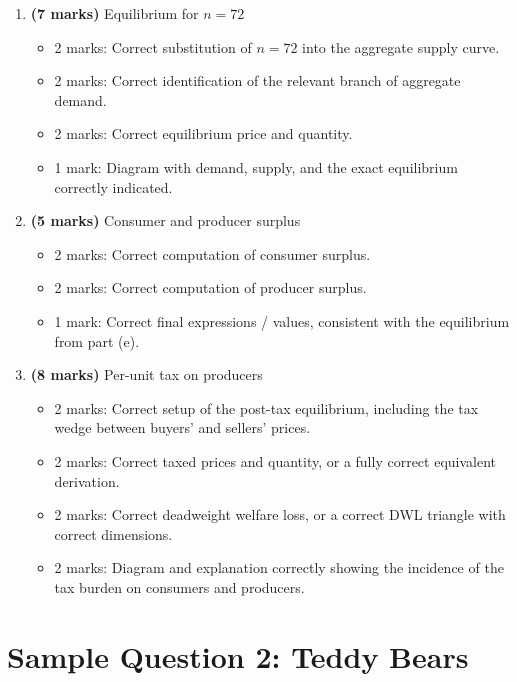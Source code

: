 \documentclass[12pt]{article}
\begin{document}
\begin{enumerate}[label=(\alph*)]
    \item \textbf{(7 marks)} Equilibrium for \(n=72\)
    \begin{itemize}
        \item 2 marks: Correct substitution of \(n=72\) into the aggregate supply curve.
        \item 2 marks: Correct identification of the relevant branch of aggregate demand.
        \item 2 marks: Correct equilibrium price and quantity.
        \item 1 mark: Diagram with demand, supply, and the exact equilibrium correctly indicated.
    \end{itemize}

    \item \textbf{(5 marks)} Consumer and producer surplus
    \begin{itemize}
        \item 2 marks: Correct computation of consumer surplus.
        \item 2 marks: Correct computation of producer surplus.
        \item 1 mark: Correct final expressions / values, consistent with the equilibrium from part (e).
    \end{itemize}

    \item \textbf{(8 marks)} Per-unit tax on producers
    \begin{itemize}
        \item 2 marks: Correct setup of the post-tax equilibrium, including the tax wedge between buyers’ and sellers’ prices.
        \item 2 marks: Correct taxed prices and quantity, or a fully correct equivalent derivation.
        \item 2 marks: Correct deadweight welfare loss, or a correct DWL triangle with correct dimensions.
        \item 2 marks: Diagram and explanation correctly showing the incidence of the tax burden on consumers and producers.
    \end{itemize}
\end{enumerate}

\newpage
\section{Sample Question 2: Teddy Bears}
\end{document}
